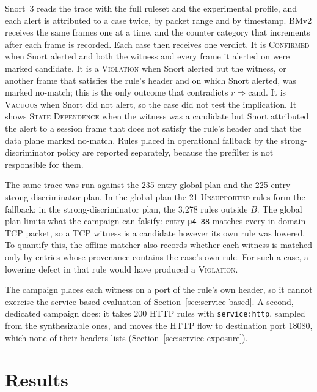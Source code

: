 \documentclass{article}
\begin{document}
Snort~3 reads the trace with the full ruleset and the experimental profile,
and each alert is attributed to a case twice, by packet range and by
timestamp. BMv2 receives the same frames one at a time, and the counter
category that increments after each frame is recorded. Each case then
receives one verdict. It is \textsc{Confirmed} when Snort alerted and both the
witness and every frame it alerted on were marked candidate. It is a
\textsc{Violation} when Snort alerted but the witness, or another frame that
satisfies the rule's header and on which Snort alerted, was marked no-match;
this is the only outcome that contradicts $r \Rightarrow \mathrm{cand}$. It is \textsc{Vacuous} when Snort did not
alert, so the case did not test the implication. It shows \textsc{State
Dependence} when the witness was a candidate but Snort attributed the alert to
a session frame that does not satisfy the rule's header and that the data
plane marked no-match. Rules placed in operational fallback by the
strong-discriminator policy are reported separately, because the prefilter is
not responsible for them.

The same trace was run against the 235-entry global plan and the 225-entry
strong-discriminator plan. In the global plan the 21 \textsc{Unsupported}
rules form the fallback; in the strong-discriminator plan, the 3,278 rules
outside $B$. The global plan limits what the campaign can falsify: entry
\texttt{p4-88} matches every in-domain TCP packet, so a TCP witness is a
candidate however its own rule was lowered. To quantify this, the offline
matcher also records whether each witness is matched only by entries whose
provenance contains the case's own rule. For such a case, a lowering defect
in that rule would have produced a \textsc{Violation}.

The campaign places each witness on a port of the rule's own header, so it
cannot exercise the service-based evaluation of
Section~\ref{sec:service-based}. A second, dedicated campaign does: it takes
200 HTTP rules with \texttt{service:http}, sampled from the synthesizable
ones, and moves the HTTP flow to destination port 18080, which none of their
headers lists (Section~\ref{sec:service-exposure}).

\section{Results}
\label{sec:results}
\end{document}
